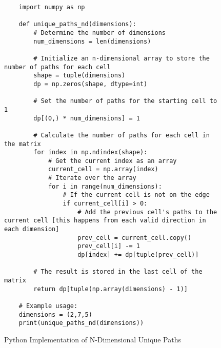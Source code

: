 \begin{figure}[H]
    \centering
    \begin{lstlisting}
    import numpy as np

    def unique_paths_nd(dimensions):
        # Determine the number of dimensions
        num_dimensions = len(dimensions)
    
        # Initialize an n-dimensional array to store the number of paths for each cell
        shape = tuple(dimensions)
        dp = np.zeros(shape, dtype=int)
    
        # Set the number of paths for the starting cell to 1
        dp[(0,) * num_dimensions] = 1
    
        # Calculate the number of paths for each cell in the matrix
        for index in np.ndindex(shape):
            # Get the current index as an array
            current_cell = np.array(index)
            # Iterate over the array
            for i in range(num_dimensions):
                # If the current cell is not on the edge
                if current_cell[i] > 0:
                    # Add the previous cell's paths to the current cell [this happens from each valid direction in each dimension]
                    prev_cell = current_cell.copy()
                    prev_cell[i] -= 1
                    dp[index] += dp[tuple(prev_cell)]
    
        # The result is stored in the last cell of the matrix
        return dp[tuple(np.array(dimensions) - 1)]
    
    # Example usage:
    dimensions = (2,7,5)
    print(unique_paths_nd(dimensions))
    \end{lstlisting}
    \caption{Python Implementation of N-Dimensional Unique Paths}
    \label{fig:nd-unique-paths}
\end{figure}

